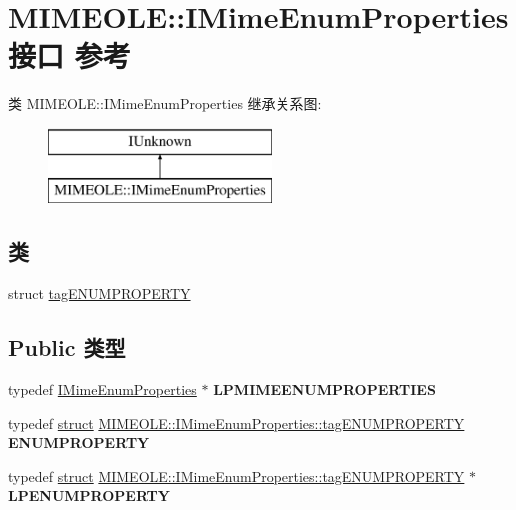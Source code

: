 \hypertarget{interface_m_i_m_e_o_l_e_1_1_i_mime_enum_properties}{}\section{M\+I\+M\+E\+O\+LE\+:\+:I\+Mime\+Enum\+Properties接口 参考}
\label{interface_m_i_m_e_o_l_e_1_1_i_mime_enum_properties}
类 M\+I\+M\+E\+O\+LE\+:\+:I\+Mime\+Enum\+Properties 继承关系图\+:\begin{figure}[H]
\begin{center}
\leavevmode
\includegraphics[height=2.000000cm]{interface_m_i_m_e_o_l_e_1_1_i_mime_enum_properties}
\end{center}
\end{figure}
\subsection*{类}
\begin{DoxyCompactItemize}
\item 
struct \hyperlink{struct_m_i_m_e_o_l_e_1_1_i_mime_enum_properties_1_1tag_e_n_u_m_p_r_o_p_e_r_t_y}{tag\+E\+N\+U\+M\+P\+R\+O\+P\+E\+R\+TY}
\end{DoxyCompactItemize}
\subsection*{Public 类型}
\begin{DoxyCompactItemize}
\item 
\mbox{\label{interface_m_i_m_e_o_l_e_1_1_i_mime_enum_properties_aa224bd126c150fdb06771f4ec94e4c50}} 
typedef \hyperlink{interface_m_i_m_e_o_l_e_1_1_i_mime_enum_properties}{I\+Mime\+Enum\+Properties} $\ast$ {\bfseries L\+P\+M\+I\+M\+E\+E\+N\+U\+M\+P\+R\+O\+P\+E\+R\+T\+I\+ES}
\item 
\mbox{\label{interface_m_i_m_e_o_l_e_1_1_i_mime_enum_properties_ab1442d0ae22b5890ac888892121927fb}} 
typedef \hyperlink{interfacestruct}{struct} \hyperlink{struct_m_i_m_e_o_l_e_1_1_i_mime_enum_properties_1_1tag_e_n_u_m_p_r_o_p_e_r_t_y}{M\+I\+M\+E\+O\+L\+E\+::\+I\+Mime\+Enum\+Properties\+::tag\+E\+N\+U\+M\+P\+R\+O\+P\+E\+R\+TY} {\bfseries E\+N\+U\+M\+P\+R\+O\+P\+E\+R\+TY}
\item 
\mbox{\label{interface_m_i_m_e_o_l_e_1_1_i_mime_enum_properties_a0cfe8b56ac8960fd26b46ac6936849d2}} 
typedef \hyperlink{interfacestruct}{struct} \hyperlink{struct_m_i_m_e_o_l_e_1_1_i_mime_enum_properties_1_1tag_e_n_u_m_p_r_o_p_e_r_t_y}{M\+I\+M\+E\+O\+L\+E\+::\+I\+Mime\+Enum\+Properties\+::tag\+E\+N\+U\+M\+P\+R\+O\+P\+E\+R\+TY} $\ast$ {\bfseries L\+P\+E\+N\+U\+M\+P\+R\+O\+P\+E\+R\+TY}
\end{DoxyCompactItemize}
